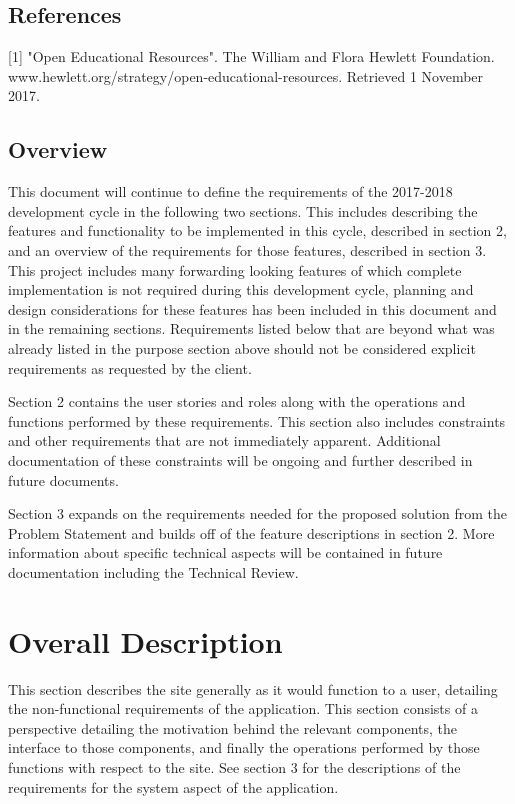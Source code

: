 \documentclass[onecolumn, draftclsnofoot,10pt, compsoc]{IEEEtran}
\begin{document}
\subsection{References}
[1] "Open Educational Resources". The William and Flora Hewlett Foundation. 
www.hewlett.org/strategy/open-educational-resources. Retrieved 1 November 2017.

\subsection{Overview}
This document will continue to define the requirements of the 2017-2018 development cycle in the following two sections. This includes describing the features and functionality to be implemented in this cycle, described in section 2, and an overview of the requirements for those features, described in section 3. This project includes many forwarding looking features of which complete implementation is not required during this development cycle, planning and design considerations for these features has been included in this document and in the remaining sections. Requirements listed below that are beyond what was already listed in the purpose section above should not be considered explicit requirements as requested by the client.

Section 2 contains the user stories and roles along with the operations and functions performed by these requirements. This section also includes constraints and other requirements that are not immediately apparent. Additional documentation of these constraints will be ongoing and further described in future documents.

Section 3 expands on the requirements needed for the proposed solution from the Problem Statement and builds off of the feature descriptions in section 2. More information about specific technical aspects will be contained in future documentation including the Technical Review. 

\section{Overall Description}
This section describes the site generally as it would function to a user, detailing the non-functional requirements of the application. This section consists of a perspective detailing the motivation behind the relevant components, the interface to those components, and finally the operations performed by those functions with respect to the site. See section 3 for the descriptions of the requirements for the system aspect of the application.
\end{document}
